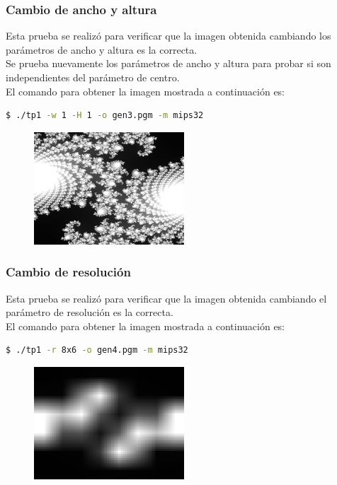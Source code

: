 \documentclass[a4paper,10pt]{article}
\begin{document}
\subsubsection{Cambio de ancho y altura}
Esta prueba se realizó para verificar que la imagen obtenida cambiando los parámetros de ancho y altura es la correcta. \\
Se prueba nuevamente los parámetros de ancho y altura para probar si son independientes del parámetro de centro. \\
El comando para obtener la imagen mostrada a continuación es:

\begin{lstlisting}[frame = single, language = bash, numbers=none]
$ ./tp1 -w 1 -H 1 -o gen3.pgm -m mips32
\end{lstlisting}

\begin{figure}[H]
 \centering
    \includegraphics[width=0.5\textwidth]{../img_informe/tres.png}
\end{figure}

\subsubsection{Cambio de resolución}
Esta prueba se realizó para verificar que la imagen obtenida cambiando el parámetro de resolución es la correcta. \\
El comando para obtener la imagen mostrada a continuación es:

\begin{lstlisting}[frame = single, language = bash, numbers=none]
$ ./tp1 -r 8x6 -o gen4.pgm -m mips32
\end{lstlisting}

\begin{figure}[H]
 \centering
    \includegraphics[width=0.5\textwidth]{../img_informe/cuatro.png}
\end{figure}
\end{document}
